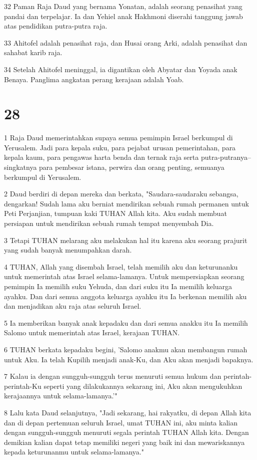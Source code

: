 \par 32 Paman Raja Daud yang bernama Yonatan, adalah seorang penasihat yang pandai dan terpelajar. Ia dan Yehiel anak Hakhmoni diserahi tanggung jawab atas pendidikan putra-putra raja.
\par 33 Ahitofel adalah penasihat raja, dan Husai orang Arki, adalah penasihat dan sahabat karib raja.
\par 34 Setelah Ahitofel meninggal, ia digantikan oleh Abyatar dan Yoyada anak Benaya. Panglima angkatan perang kerajaan adalah Yoab.

\chapter{28}

\par 1 Raja Daud memerintahkan supaya semua pemimpin Israel berkumpul di Yerusalem. Jadi para kepala suku, para pejabat urusan pemerintahan, para kepala kaum, para pengawas harta benda dan ternak raja serta putra-putranya--singkatnya para pembesar istana, perwira dan orang penting, semuanya berkumpul di Yerusalem.
\par 2 Daud berdiri di depan mereka dan berkata, "Saudara-saudaraku sebangsa, dengarkan! Sudah lama aku berniat mendirikan sebuah rumah permanen untuk Peti Perjanjian, tumpuan kaki TUHAN Allah kita. Aku sudah membuat persiapan untuk mendirikan sebuah rumah tempat menyembah Dia.
\par 3 Tetapi TUHAN melarang aku melakukan hal itu karena aku seorang prajurit yang sudah banyak menumpahkan darah.
\par 4 TUHAN, Allah yang disembah Israel, telah memilih aku dan keturunanku untuk memerintah atas Israel selama-lamanya. Untuk mempersiapkan seorang pemimpin Ia memilih suku Yehuda, dan dari suku itu Ia memilih keluarga ayahku. Dan dari semua anggota keluarga ayahku itu Ia berkenan memilih aku dan menjadikan aku raja atas seluruh Israel.
\par 5 Ia memberikan banyak anak kepadaku dan dari semua anakku itu Ia memilih Salomo untuk memerintah atas Israel, kerajaan TUHAN.
\par 6 TUHAN berkata kepadaku begini, 'Salomo anakmu akan membangun rumah untuk Aku. Ia telah Kupilih menjadi anak-Ku, dan Aku akan menjadi bapaknya.
\par 7 Kalau ia dengan sungguh-sungguh terus menuruti semua hukum dan perintah-perintah-Ku seperti yang dilakukannya sekarang ini, Aku akan mengukuhkan kerajaannya untuk selama-lamanya.'"
\par 8 Lalu kata Daud selanjutnya, "Jadi sekarang, hai rakyatku, di depan Allah kita dan di depan pertemuan seluruh Israel, umat TUHAN ini, aku minta kalian dengan sungguh-sungguh menuruti segala perintah TUHAN Allah kita. Dengan demikian kalian dapat tetap memiliki negeri yang baik ini dan mewariskannya kepada keturunanmu untuk selama-lamanya."
